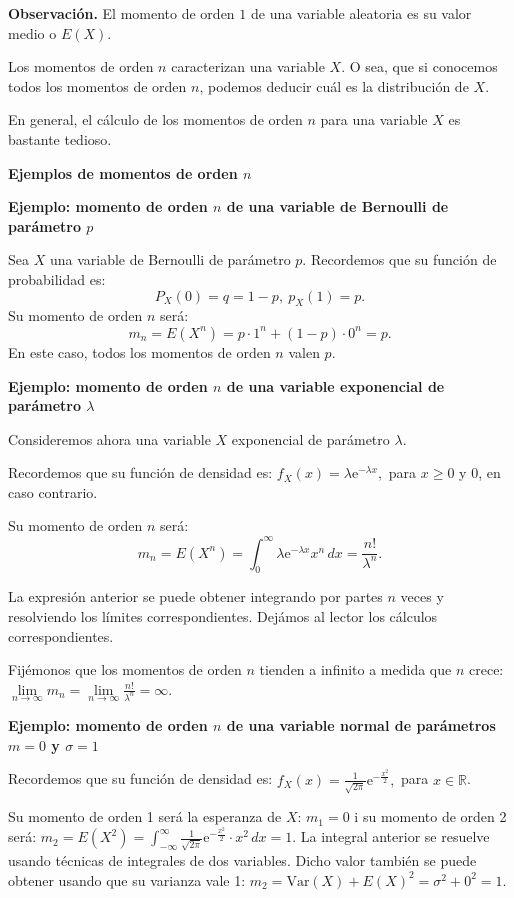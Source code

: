 \documentclass[]{book}
\begin{document}
\textbf{Observación.}
El momento de orden \(1\) de una variable aleatoria es su valor medio o \(E(X)\).

Los momentos de orden \(n\) caracterizan una variable \(X\). O sea, que si conocemos todos los momentos de orden \(n\), podemos deducir cuál es la distribución de \(X\).

En general, el cálculo de los momentos de orden \(n\) para una variable \(X\) es bastante tedioso.

\textbf{Ejemplos de momentos de orden \(n\)}

\textbf{Ejemplo: momento de orden \(n\) de una variable de Bernoulli de parámetro \(p\)}

Sea \(X\) una variable de Bernoulli de parámetro \(p\). Recordemos que su función de probabilidad es:
\[
P_X(0)=q=1-p,\ p_X(1)=p.
\]
Su momento de orden \(n\) será:
\[
m_n = E\left(X^n\right)=p\cdot 1^n+(1-p)\cdot 0^n = p.
\]
En este caso, todos los momentos de orden \(n\) valen \(p\).

\textbf{Ejemplo: momento de orden \(n\) de una variable exponencial de parámetro \(\lambda\)}

Consideremos ahora una variable \(X\) exponencial de parámetro \(\lambda\).

Recordemos que su función de densidad es: \(f_X(x)=\lambda \mathrm{e}^{-\lambda x},\) para \(x\geq 0\) y \(0\), en caso contrario.

Su momento de orden \(n\) será:
\[
m_n = E\left(X^n\right)=\int_0^\infty \lambda \mathrm{e}^{-\lambda x} x^n\, dx =\frac{n!}{\lambda^n}.
\]

La expresión anterior se puede obtener integrando por partes \(n\) veces y resolviendo los límites correspondientes. Dejámos al lector los cálculos correspondientes.

Fijémonos que los momentos de orden \(n\) tienden a infinito a medida que \(n\) crece: \(\lim\limits_{n\to\infty}m_n = \lim\limits_{n\to\infty}\frac{n!}{\lambda^n}=\infty\).

\textbf{Ejemplo: momento de orden \(n\) de una variable normal de parámetros \(m=0\) y \(\sigma =1\)}

Recordemos que su función de densidad es: \(f_X(x)=\frac{1}{\sqrt{2\pi}}\mathrm{e}^{-\frac{x^2}{2}},\) para \(x\in \mathbb{R}\).

Su momento de orden 1 será la esperanza de \(X\): \(m_1 = 0\) i su momento de orden 2 será:
\(m_2 = E\left(X^2\right)=\int_{-\infty}^\infty \frac{1}{\sqrt{2\pi}}\mathrm{e}^{-\frac{x^2}{2}}\cdot x^2\, dx = 1.\)
La integral anterior se resuelve usando técnicas de integrales de dos variables.
Dicho valor también se puede obtener usando que su varianza vale 1:
\(m_2 = \mathrm{Var}(X)+E(X)^2 = \sigma^2 +0^2 = 1.\)
\end{document}
